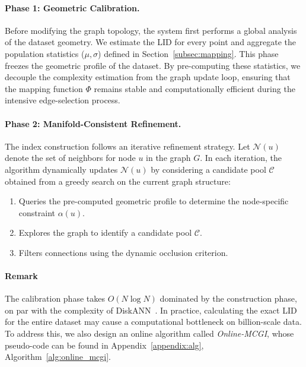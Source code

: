 \documentclass{article}
\theoremstyle{plain}
\theoremstyle{definition}
\theoremstyle{remark}
\begin{document}
\paragraph{Phase 1: Geometric Calibration.}
Before modifying the graph topology, the system first performs a global analysis of the dataset geometry. We estimate the LID for every point and aggregate the population statistics ($\mu, \sigma$) defined in Section~\ref{subsec:mapping}. 
This phase freezes the geometric profile of the dataset. By pre-computing these statistics, we decouple the complexity estimation from the graph update loop, ensuring that the mapping function $\Phi$ remains stable and computationally efficient during the intensive edge-selection process.

\paragraph{Phase 2: Manifold-Consistent Refinement.}
The index construction follows an iterative refinement strategy. 
Let $\mathcal{N}(u)$ denote the set of neighbors for node $u$ in the graph $G$. 
In each iteration, the algorithm dynamically updates $\mathcal{N}(u)$ by considering a candidate pool $\mathcal{C}$ obtained from a greedy search on the current graph structure:
\begin{enumerate}
    \item Queries the pre-computed geometric profile to determine the node-specific constraint $\alpha(u)$.
    \item Explores the graph to identify a candidate pool $\mathcal{C}$.
    \item Filters connections using the dynamic occlusion criterion. 
\end{enumerate}

\paragraph{Remark} The calibration phase takes $O(N \log N)$ dominated by the construction phase, on par with the complexity of DiskANN~\cite{subramanya2019diskann}.
In practice, calculating the exact LID for the entire dataset may cause a computational bottleneck on billion-scale data. 
To address this, we also design an online algorithm called \textit{Online-MCGI}, whose pseudo-code can be found in Appendix~\ref{appendix:alg}, Algorithm~\ref{alg:online_mcgi}.

\end{document}
